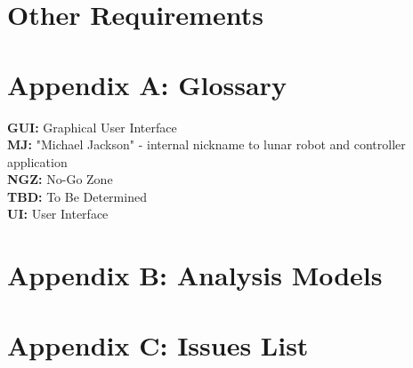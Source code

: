 \documentclass[10pt,a4paper,titlepage]{article}
\begin{document}
	\section{Other Requirements}
	
	\section{Appendix A: Glossary}
	\textbf{GUI:} Graphical User Interface\\	
	\textbf{MJ:} "Michael Jackson" - internal nickname to lunar robot and controller application	\\
	\textbf{NGZ:} No-Go Zone\\
	\textbf{TBD:} To Be Determined\\
	\textbf{UI:} User Interface\\
	
		\section{Appendix B: Analysis Models}
	
	\section{Appendix C: Issues List}
	
\end{document}

